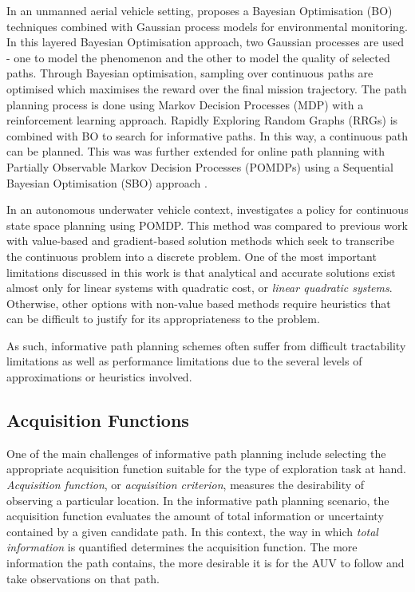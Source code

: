 			In an unmanned aerial vehicle setting, \cite{Roman:BayesianOptimisation} proposes a Bayesian Optimisation (BO) techniques combined with Gaussian process models for environmental monitoring. In this layered Bayesian Optimisation approach, two Gaussian processes are used - one to model the phenomenon and the other to model the quality of selected paths. Through Bayesian optimisation, sampling over continuous paths are optimised which maximises the reward over the final mission trajectory. The path planning process is done using Markov Decision Processes (MDP) with a reinforcement learning approach. Rapidly Exploring Random Graphs (RRGs) is combined with BO to search for informative paths. In this way, a continuous path can be planned. This was was further extended for online path planning with Partially Observable Markov Decision Processes (POMDPs) using a Sequential Bayesian Optimisation (SBO) approach \citep{Roman:SequentialBayesianOptimisation}.
			
			In an autonomous underwater vehicle context, \cite{ParametricPOMDP} investigates a policy for continuous state space planning using POMDP. This method was compared to previous work with value-based and gradient-based solution methods which seek to transcribe the continuous problem into a discrete problem. One of the most important limitations discussed in this work is that analytical and accurate solutions exist almost only for linear systems with quadratic cost, or \textit{linear quadratic systems}. Otherwise, other options with non-value based methods require heuristics that can be difficult to justify for its appropriateness to the problem. 
			
			As such, informative path planning schemes often suffer from difficult tractability limitations as well as performance limitations due to the several levels of approximations or heuristics involved.
		
		\subsection{Acquisition Functions}
		\label{Background:RelatedWork:AcquisitionFunctions}
		
			One of the main challenges of informative path planning include selecting the appropriate acquisition function suitable for the type of exploration task at hand. \textit{Acquisition function}, or \textit{acquisition criterion}, measures the desirability of observing a particular location. In the informative path planning scenario, the acquisition function evaluates the amount of total information or uncertainty contained by a given candidate path. In this context, the way in which \textit{total information} is quantified determines the acquisition function. The more information the path contains, the more desirable it is for the AUV to follow and take observations on that path. 
	
